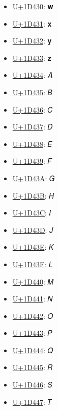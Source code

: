 \begin{itemize}
	\item \href{https://www.compart.com/en/unicode/U+1D430}{U+1D430}: 𝐰
	\item \href{https://www.compart.com/en/unicode/U+1D431}{U+1D431}: 𝐱
	\item \href{https://www.compart.com/en/unicode/U+1D432}{U+1D432}: 𝐲
	\item \href{https://www.compart.com/en/unicode/U+1D433}{U+1D433}: 𝐳
	\item \href{https://www.compart.com/en/unicode/U+1D434}{U+1D434}: 𝐴
	\item \href{https://www.compart.com/en/unicode/U+1D435}{U+1D435}: 𝐵
	\item \href{https://www.compart.com/en/unicode/U+1D436}{U+1D436}: 𝐶
	\item \href{https://www.compart.com/en/unicode/U+1D437}{U+1D437}: 𝐷
	\item \href{https://www.compart.com/en/unicode/U+1D438}{U+1D438}: 𝐸
	\item \href{https://www.compart.com/en/unicode/U+1D439}{U+1D439}: 𝐹
	\item \href{https://www.compart.com/en/unicode/U+1D43A}{U+1D43A}: 𝐺
	\item \href{https://www.compart.com/en/unicode/U+1D43B}{U+1D43B}: 𝐻
	\item \href{https://www.compart.com/en/unicode/U+1D43C}{U+1D43C}: 𝐼
	\item \href{https://www.compart.com/en/unicode/U+1D43D}{U+1D43D}: 𝐽
	\item \href{https://www.compart.com/en/unicode/U+1D43E}{U+1D43E}: 𝐾
	\item \href{https://www.compart.com/en/unicode/U+1D43F}{U+1D43F}: 𝐿
	\item \href{https://www.compart.com/en/unicode/U+1D440}{U+1D440}: 𝑀
	\item \href{https://www.compart.com/en/unicode/U+1D441}{U+1D441}: 𝑁
	\item \href{https://www.compart.com/en/unicode/U+1D442}{U+1D442}: 𝑂
	\item \href{https://www.compart.com/en/unicode/U+1D443}{U+1D443}: 𝑃
	\item \href{https://www.compart.com/en/unicode/U+1D444}{U+1D444}: 𝑄
	\item \href{https://www.compart.com/en/unicode/U+1D445}{U+1D445}: 𝑅
	\item \href{https://www.compart.com/en/unicode/U+1D446}{U+1D446}: 𝑆
	\item \href{https://www.compart.com/en/unicode/U+1D447}{U+1D447}: 𝑇

\end{itemize}
